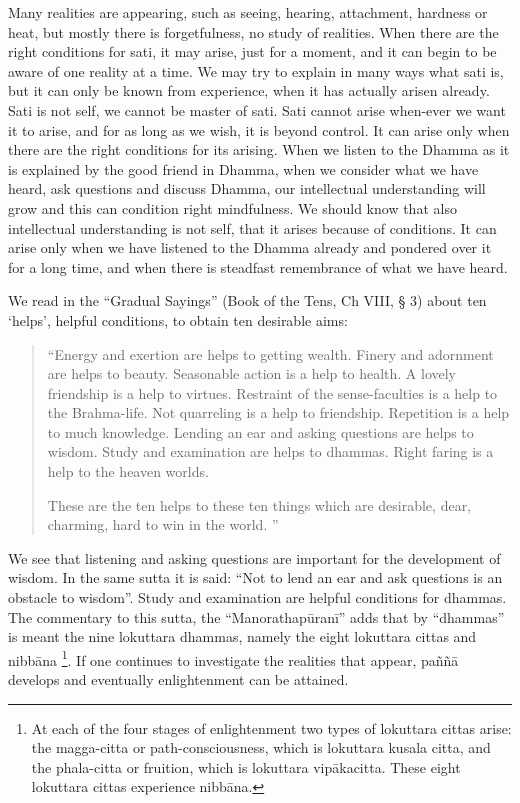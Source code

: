 Many realities are appearing, such as seeing, hearing, attachment,
hardness or heat, but mostly there is forgetfulness, no study of
realities. When there are the right conditions for sati, it may arise,
just for a moment, and it can begin to be aware of one reality at a
time. We may try to explain in many ways what sati is, but it can only
be known from experience, when it has actually arisen already. Sati is
not self, we cannot be master of sati. Sati cannot arise when-ever we
want it to arise, and for as long as we wish, it is beyond control. It
can arise only when there are the right conditions for its arising. When
we listen to the Dhamma as it is explained by the good friend in Dhamma,
when we consider what we have heard, ask questions and discuss Dhamma,
our intellectual understanding will grow and this can condition right
mindfulness. We should know that also intellectual understanding is not
self, that it arises because of conditions. It can arise only when we
have listened to the Dhamma already and pondered over it for a long
time, and when there is steadfast remembrance of what we have heard.

We read in the ``Gradual Sayings'' (Book of the Tens, Ch VIII, § 3)
about ten `helps', helpful conditions, to obtain ten desirable aims:

\begin{quote}
``Energy and exertion are helps to getting wealth. Finery and adornment
are helps to beauty. Seasonable action is a help to health. A lovely
friendship is a help to virtues. Restraint of the sense-faculties is a
help to the Brahma-life. Not quarreling is a help to friendship.
Repetition is a help to much knowledge. Lending an ear and asking
questions are helps to wisdom. Study and examination are helps to
dhammas. Right faring is a help to the heaven worlds.

These are the ten helps to these ten things which are desirable, dear,
charming, hard to win in the world. ''
\end{quote}

We see that listening and asking questions are important for the
development of wisdom. In the same sutta it is said: ``Not to lend an
ear and ask questions is an obstacle to wisdom''. Study and examination
are helpful conditions for dhammas. The commentary to this sutta, the
``Manorathapūranī'' adds that by ``dhammas'' is meant the nine lokuttara
dhammas, namely the eight lokuttara cittas and nibbāna
\footnote{At each of the four stages of
enlightenment two types of lokuttara cittas arise: the magga-citta or
path-consciousness, which is lokuttara kusala citta, and the phala-citta
or fruition, which is lokuttara vipākacitta. These eight lokuttara
cittas experience nibbāna.}.
If one continues to investigate the realities that appear, paññā
develops and eventually enlightenment can be attained.

